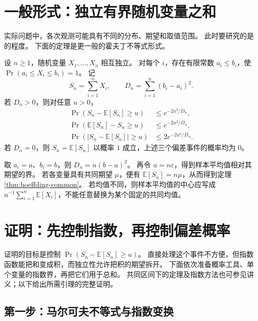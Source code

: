 \documentclass[UTF8]{ctexart}
\begin{document}
\section{一般形式：独立有界随机变量之和}
\label{sec:hoeffding-general}

实际问题中，各次观测可能具有不同的分布、期望和取值范围。
此时要研究的是的程度。
下面的定理是更一般的霍夫丁不等式形式\cite{hoeffding1963}。

\begin{theorem}[独立有界随机变量的霍夫丁不等式]
\label{thm:hoeffding-general}
设 $n\geq1$，随机变量 $X_1,\ldots,X_n$ 相互独立。
对每个 $i$，存在有限常数 $a_i\leq b_i$，使 $\Pr(a_i\leq X_i\leq b_i)=1$。
记
\[
  S_n=\sum_{i=1}^{n}X_i,
  \qquad D_n=\sum_{i=1}^{n}(b_i-a_i)^2.
\]
若 $D_n>0$，则对任意 $u>0$，
\begin{align}
  \Pr(S_n-\mathbb E[S_n]\geq u)&\leq e^{-2u^2/D_n},
  \label{eq:hoeffding-sum-upper}\\
  \Pr(\mathbb E[S_n]-S_n\geq u)&\leq e^{-2u^2/D_n},
  \label{eq:hoeffding-sum-lower}\\
  \Pr\!\left(\lvert S_n-\mathbb E[S_n]\rvert\geq u\right)&\leq2e^{-2u^2/D_n}.
  \label{eq:hoeffding-sum-two-sided}
\end{align}
若 $D_n=0$，则 $S_n=\mathbb E[S_n]$ 以概率 $1$ 成立，上述三个偏差事件的概率均为 $0$。
\end{theorem}

取 $a_i=a$、$b_i=b$，则 $D_n=n(b-a)^2$。
再令 $u=n\varepsilon$，得到样本平均值相对其期望的界。
若各变量具有共同期望 $\mu$，便有 $\mathbb E[S_n]=n\mu$，从而得到定理\ref{thm:hoeffding-common}。
若均值不同，则样本平均值的中心应写成
$n^{-1}\sum_{i=1}^{n}\mathbb E[X_i]$，不能任意替换为某个固定的共同均值。

\section{证明：先控制指数，再控制偏差概率}
\label{sec:hoeffding-proof}

证明的目标是控制 $\Pr(S_n-\mathbb E[S_n]\geq u)$。
直接处理这个事件不方便，但指数函数能把和变成积，而独立性允许把积的期望拆开。
下面依次准备概率工具、单个变量的指数界，再把它们用于总和。
共同区间下的定理及指数方法也可参见讲义\cite{duchi-hoeffding}；以下给出所需引理的完整证明。

\subsection{第一步：马尔可夫不等式与指数变换}
\end{document}
